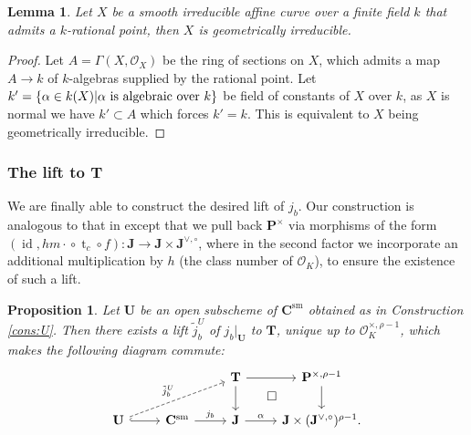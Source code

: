 \documentclass[11pt,oneside]{amsart}
\theoremstyle{plain}
\newtheorem{proposition}[theorem]{Proposition}
\newtheorem{lemma}[theorem]{Lemma}
\theoremstyle{definition}
\DeclareMathOperator{\sm}{sm}
\DeclareMathOperator{\id}{id} \DeclareMathOperator{\Sel}{Sel}
\DeclareMathOperator{\tr}{t}
\def\TT{\mathbf{T}}
\def\J{\mathbf{J}}
\def\Jo{\mathbf{J}^{\vee,\circ}}
\def\P{\mathbf{P}}
\def\CC{\mathbf{C}}
\def\U{\mathbf{U}}
\def\oh{\mathcal{O}}
\begin{document}
\begin{lemma}
Let $X$ be a smooth irreducible affine curve over a finite field $k$ that admits a $k$-rational point, then $X$ is geometrically irreducible. 
\end{lemma}
 
 
\begin{proof} Let $A = \Gamma(X, \oh_X)$ be the ring of sections on $X$, which  admits a map $A \rightarrow k$ of $k$-algebras supplied by the rational point. Let $k' = \{\alpha \in k(X) | \alpha \textup{ is algebraic over } k\}$ be field of constants of $X$ over $k$, as $X$ is normal we have $k' \subset A$ which forces $k' = k$. This is equivalent to $X$ being geometrically irreducible. 
\end{proof}


\subsubsection{The lift to $\TT$} 

We are finally able to construct the desired lift of $j_b$. Our construction is  analogous to that in \cite[\S 2]{EL19} except that we pull back $\P^{\times}$ via morphisms of the form $(\id, {hm\cdot}\circ \tr_c\circ f):\J\rightarrow \J\times \Jo$, where in the second factor we incorporate an additional multiplication by $h$ (the class number of $\oh_K$), to ensure the existence of such a lift.

\begin{proposition}\label{prop:Ulift}
Let $\U$ be an open subscheme of $\CC^{\sm}$ obtained as in Construction \ref{cons:U}. Then there exists a lift $\tilde{j}_b^U$ of $j_{b}\vert_{\U}$ to $\TT$, unique up to $\oh_K^{\times, \rho-1}$, which makes the following diagram commute:
\begin{equation}\label{diag:AJliftU}
\begin{tikzcd}[bend angle = 20]
  &
  & \TT  \arrow{r} \arrow{d} \arrow[phantom]{dr}{\square}
  & \P^{\times, \rho-1} \arrow{d} \\
  \U \arrow[hook]{r} \arrow[dashrightarrow]{rru}{\tilde{j}_{b}^U}
  & \CC^{\sm} \arrow{r}{j_b} 
  & \J \arrow{r}{\alpha}
  & \J\times (\Jo)^{\rho-1}.
\end{tikzcd}
\end{equation}
\end{proposition}
\end{document}
